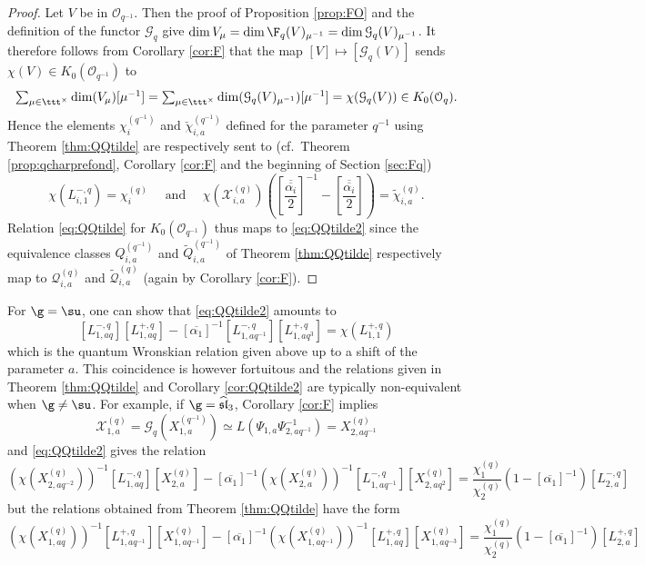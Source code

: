 \documentclass[11pt]{amsart}
\theoremstyle{definition}
\theoremstyle{remark}
\numberwithin{equation}{section}
\begin{document}
\begin{proof} Let $V$ be in $\mathcal{O}_{q^{-1}}$. Then the proof of Proposition \ref{prop:FO} and the definition of the functor $\mathcal{G}_q$ give $\dim V_{\mu}=\dim \F_q(V)_{\mu^{-1}}=\dim\mathcal{G}_q(V)_{\mu^{-1}}$. It therefore follows from Corollary \ref{cor:F} that the map $[V]\mapsto[\mathcal{G}_q(V)]$ sends $\chi(V)\in K_0(\mathcal{O}_{q^{-1}})$ to 
$$\textstyle  \sum_{\mu\in \ttt^{\times}}\dim (V_{\mu})[\mu^{-1}] = \sum_{\mu\in \ttt^{\times}}\dim (\mathcal{G}_q(V)_{\mu^{-1}})[\mu^{-1}] = \chi(\mathcal{G}_q(V))\in K_0(\mathcal{O}_q).$$ 
Hence the elements $\chi_i^{(q^{-1})}$ and $\check{\chi}_{i,a}^{(q^{-1})}$ defined for the parameter $q^{-1}$ using Theorem \ref{thm:QQtilde} are respectively sent to (cf.~Theorem \ref{prop:qcharprefond}, Corollary \ref{cor:F} and the beginning of Section \ref{sec:Fq})
$$\chi(L_{i,1}^{-,q})=\chi_i^{(q)} \quad \text{ and }\quad \chi(\mathcal{X}_{i,a}^{(q)})\left({\textstyle \left[\overline{\overline{\frac{\alpha_i}{2}}}\right]^{-1}-\left[\overline{\overline{\frac{\alpha_i}{2}}}\right]}\right)=\widetilde{\chi}_{i,a}^{(q)}.$$
Relation \eqref{eq:QQtilde} for $K_0(\mathcal{O}_{q^{-1}})$ thus maps to \eqref{eq:QQtilde2} since the equivalence classes $Q_{i,a}^{(q^{-1})}$ and $\tilde{Q}_{i,a}^{(q^{-1})}$ of Theorem \ref{thm:QQtilde} respectively map to $\mathcal{Q}_{i,a}^{(q)}$ and $\tilde{\mathcal{Q}}_{i,a}^{(q)}$ (again by Corollary \ref{cor:F}).
\end{proof}
For $\g = \su$, one can show that \eqref{eq:QQtilde2} amounts to 
$$ [L_{1,aq}^{-,q}][L_{1,aq}^{+,q}]-[\overline{\alpha_1}]^{-1}[L_{1,aq^{-1}}^{-,q}][L_{1,aq^3}^{+,q}] = \chi(L_{1,1}^{+,q}) $$
which is the quantum Wronskian relation given above up to a shift of the parameter $a$. This coincidence is however fortuitous and the relations given in Theorem \ref{thm:QQtilde} and Corollary \ref{cor:QQtilde2} are typically non-equivalent when $\g \neq \su$. For example, if $\g = \widehat{\mathfrak{sl}}_3$, Corollary \ref{cor:F} implies
$$\mathcal{X}_{1,a}^{(q)} = \mathcal{G}_q(X_{1,a}^{(q^{-1})}) \simeq L(\Psi_{1,a}\Psi_{2,aq^{-1}}^{-1}) = X_{2,aq^{-1}}^{(q)}$$
and \eqref{eq:QQtilde2} gives the relation
$$ (\chi(X_{2,aq^{-2}}^{(q)}))^{-1}[L_{1,aq}^{-,q}][X_{2,a}^{(q)}]-[\overline{\alpha_1}]^{-1}(\chi(X_{2,a}^{(q)}))^{-1}[L_{1,aq^{-1}}^{-,q}][X_{2,aq^2}^{(q)}] = \textstyle\frac{\chi_1^{(q)}}{\chi_2^{(q)}}(1-[\overline{\alpha_1}]^{-1})[L_{2,a}^{-,q}] $$
but the relations obtained from Theorem \ref{thm:QQtilde} have the form
$$ (\chi(X_{1,aq}^{(q)}))^{-1}[L_{1,aq^{-1}}^{+,q}][X_{1,aq^{-1}}^{(q)}] - [\overline{\alpha_1}]^{-1}(\chi(X_{1,aq^{-1}}^{(q)}))^{-1}[L_{1,aq}^{+,q}][X_{1,aq^{-3}}^{(q)}]=\textstyle\frac{\chi_1^{(q)}}{\chi_2^{(q)}}(1-[\overline{\alpha_1}]^{-1})[L_{2,a}^{+,q}]$$ 
\end{document}

